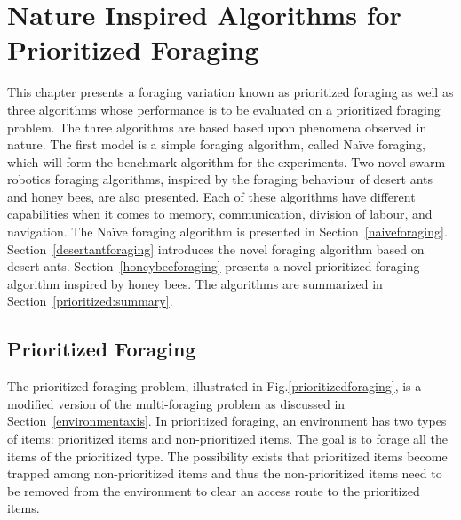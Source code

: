
\chapter{Nature Inspired Algorithms for Prioritized Foraging}
\label{chap:third}


This chapter presents a foraging variation known as prioritized foraging as well as three algorithms whose performance is to be evaluated on a prioritized foraging problem. The three algorithms are based based upon phenomena observed in nature. The first model is a simple foraging algorithm, called Na\"ive foraging, which will form the benchmark algorithm for the experiments. Two novel swarm robotics foraging algorithms, inspired by the foraging behaviour of desert ants and honey bees, are also presented. Each of these algorithms have different capabilities when it comes to memory, communication, division of labour, and navigation. The Na\"ive foraging algorithm is presented in Section~\ref{naiveforaging}. Section~\ref{desertantforaging} introduces the novel foraging algorithm based on desert ants. Section~\ref{honeybeeforaging} presents a novel prioritized foraging algorithm inspired by honey bees. The algorithms are summarized in Section~\ref{prioritized:summary}.

\section{Prioritized Foraging}
\label{sec:second:prioritizedforaging}


The prioritized foraging problem, illustrated in Fig.\ref{prioritizedforaging}, is a modified version of the multi-foraging problem as discussed in Section~\ref{environmentaxis}. In prioritized foraging, an environment has two types of items: prioritized items and non-prioritized items. The goal is to forage all the items of the prioritized type. The possibility exists that prioritized items become trapped among non-prioritized items and thus the non-prioritized items need to be removed from the environment to clear an access route to the prioritized items. 

